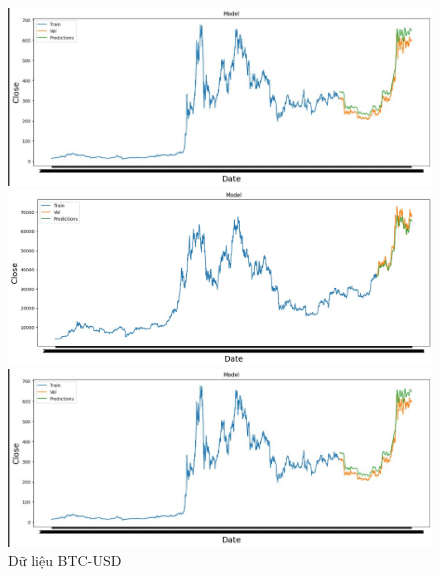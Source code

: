 \documentclass[conference]{IEEEtran}
\begin{document}
	\begin{figure}[H]
		\centering
		\begin{minipage}{0.15\textwidth}
			\centering
			\includegraphics[width=1\textwidth]{Figure/LSTM_I.jpg}
		\end{minipage}
		\hfill
		\begin{minipage}{0.15\textwidth}
			\centering
			\includegraphics[width=1\textwidth]{Figure/BTC_LSTM.jpg}
		\end{minipage}
		\hfill
		\begin{minipage}{0.15\textwidth}
			\centering
			\includegraphics[width=1\textwidth]{Figure/LSTM_I.jpg}
		\end{minipage}
		\caption{Dữ liệu BTC-USD}
		\label{fig:1}
	\end{figure}
	
\end{document}
